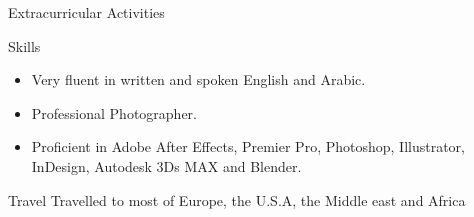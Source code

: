 \documentclass{resume}
\begin{document}
\begin{small}
\begin{rSection} {Extracurricular Activities}
	\end{rSection}
	
	\begin{rSection}{Skills}
		\begin{itemize}
			\itemsep -0.4em
			\item Very fluent in written and spoken English and Arabic.
			\item Professional Photographer.
			\item Proficient in Adobe After Effects, Premier Pro, Photoshop, Illustrator, InDesign, Autodesk 3Ds MAX and Blender.
		\end{itemize}
	\end{rSection}
	\begin{rSection}{Travel}
		Travelled to most of Europe, the U.S.A, the Middle east and Africa
	\end{rSection}
\end{small}
	
\end{document}

